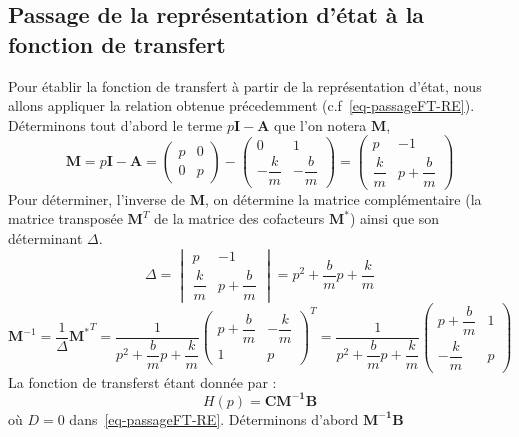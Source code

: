 \subsection{Passage de la représentation d'état à la fonction de transfert}
Pour établir la fonction de transfert à partir de la représentation d'état, nous
allons appliquer la relation obtenue précedemment (c.f~\cref{eq-passageFT-RE}).
Déterminons tout d'abord le terme $p\boldsymbol{I}-\boldsymbol{A}$ que l'on 
notera $\boldsymbol{M}$,
\[
    \boldsymbol{M}=
    p\boldsymbol{I}-\boldsymbol{A}=
    \begin{pmatrix}
        p&0\\
        0&p
    \end{pmatrix}-
    \begin{pmatrix}
        0 & 1 \\[1em]
        -\dfrac{k}{m} & -\dfrac{b}{m}
    \end{pmatrix}=
    \begin{pmatrix}
        p & -1 \\
        \dfrac{k}{m} & p+\dfrac{b}{m}
    \end{pmatrix}
\]
Pour déterminer, l'inverse de $\boldsymbol{M}$, on détermine la matrice
complémentaire (la matrice transposée $\boldsymbol{M}^T$ de la matrice des 
cofacteurs $\boldsymbol{M^*}$) ainsi que son déterminant $\Delta$.
\[
    \Delta=
    \begin{vmatrix} 
        p & -1 \\[1em]
        \dfrac{k}{m} & p+\dfrac{b}{m}
    \end{vmatrix}=
    p^2+\dfrac{b}{m}p+\dfrac{k}{m}
\]
\[
    \boldsymbol{M}^{-1}=\dfrac{1}{\Delta}\boldsymbol{M^*}^T=
    \dfrac{1}{p^2+\dfrac{b}{m}p+\dfrac{k}{m}}
    \begin{pmatrix}
        p+\dfrac{b}{m} & -\dfrac{k}{m}\\[1em]
        1 & p
    \end{pmatrix}^T=
    \dfrac{1}{p^2+\dfrac{b}{m}p+\dfrac{k}{m}}
    \begin{pmatrix}
        p+\dfrac{b}{m} & 1 \\[1em]
        -\dfrac{k}{m} & p
    \end{pmatrix}
\]
La fonction de transferst étant donnée par :
\[
    H(p)=\boldsymbol{C}\boldsymbol{M^{-1}}\boldsymbol{B}
\]
où $D=0$ dans~\cref{eq-passageFT-RE}.
Déterminons d'abord $\boldsymbol{M^{-1}}\boldsymbol{B}$

